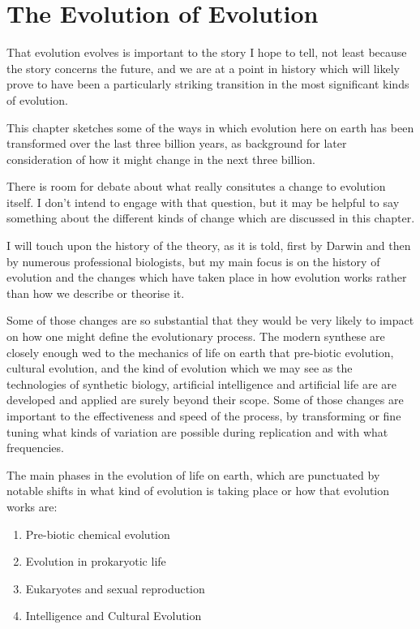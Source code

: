 \chapter{The Evolution of Evolution}\label{EvolutionOfEvolution}

That evolution evolves is important to the story I hope to tell, not least because the story concerns the future, and we are at a point in history which will likely prove to have been a particularly striking transition in the most significant kinds of evolution.

This chapter sketches some of the ways in which evolution here on earth has been transformed over the last three billion years, as background for later consideration of how it might change in the next three billion.

There is room for debate about what really consitutes a change to evolution itself.
I don't intend to engage with that question, but it may be helpful to say something about the different kinds of change which are discussed in this chapter.

I will touch upon the history of the theory, as it is told, first by Darwin and then by numerous professional biologists, but my main focus is on the history of evolution and the changes which have taken place in how evolution works rather than how we describe or theorise it.

Some of those changes are so substantial that they would be very likely to impact on how one might define the evolutionary process.
The modern synthese are closely enough wed to the mechanics of life on earth that pre-biotic evolution, cultural evolution, and the kind of evolution which we may see as the technologies of synthetic biology, artificial intelligence and artificial life are are developed and applied are surely beyond their scope. 
Some of those changes are important to the effectiveness and speed of the process, by transforming or fine tuning what kinds of variation are possible during replication and with what frequencies. 

The main phases in the evolution of life on earth, which are punctuated by notable shifts in what kind of evolution is taking place or how that evolution works are:

\begin{enumerate}
\item  Pre-biotic chemical evolution
\item  Evolution in prokaryotic life
\item  Eukaryotes and sexual reproduction
\item  Intelligence and Cultural Evolution
\end{enumerate}

